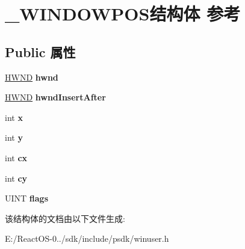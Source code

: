 \hypertarget{struct___w_i_n_d_o_w_p_o_s}{}\section{\+\_\+\+W\+I\+N\+D\+O\+W\+P\+O\+S结构体 参考}
\label{struct___w_i_n_d_o_w_p_o_s}
\subsection*{Public 属性}
\begin{DoxyCompactItemize}
\item 
\mbox{\label{struct___w_i_n_d_o_w_p_o_s_a1040e48cab84a9ed690354eb3398cc3b}} 
\hyperlink{interfacevoid}{H\+W\+ND} {\bfseries hwnd}
\item 
\mbox{\label{struct___w_i_n_d_o_w_p_o_s_a7955847d08d75e50b11cf395d512c6eb}} 
\hyperlink{interfacevoid}{H\+W\+ND} {\bfseries hwnd\+Insert\+After}
\item 
\mbox{\label{struct___w_i_n_d_o_w_p_o_s_a019a7fc3b1e517110a7019066e8ecf01}} 
int {\bfseries x}
\item 
\mbox{\label{struct___w_i_n_d_o_w_p_o_s_ae0facde1e09246f3477ac8a7ddb7301c}} 
int {\bfseries y}
\item 
\mbox{\label{struct___w_i_n_d_o_w_p_o_s_a921942d8d04be71af57170d2b99a5986}} 
int {\bfseries cx}
\item 
\mbox{\label{struct___w_i_n_d_o_w_p_o_s_a6cdb4c4aceb02f8c43c97cdca0b6a963}} 
int {\bfseries cy}
\item 
\mbox{\label{struct___w_i_n_d_o_w_p_o_s_a64b5159dc7aa9eac646146de4977eb6d}} 
U\+I\+NT {\bfseries flags}
\end{DoxyCompactItemize}


该结构体的文档由以下文件生成\+:\begin{DoxyCompactItemize}
\item 
E\+:/\+React\+O\+S-\/0../sdk/include/psdk/winuser.\+h\end{DoxyCompactItemize}
